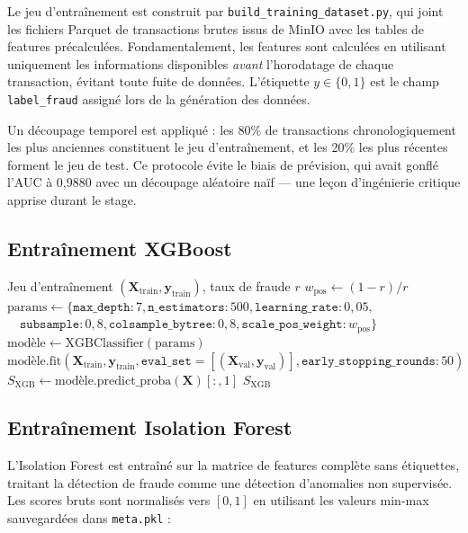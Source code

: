\documentclass[12pt,a4paper,oneside]{book}
\theoremstyle{definition}
\theoremstyle{plain}
\begin{document}
Le jeu d'entraînement est construit par \texttt{build\_training\_dataset.py}, qui joint les fichiers Parquet de transactions brutes issus de MinIO avec les tables de features précalculées. Fondamentalement, les features sont calculées en utilisant uniquement les informations disponibles \textit{avant} l'horodatage de chaque transaction, évitant toute fuite de données. L'étiquette $y \in \{0, 1\}$ est le champ \texttt{label\_fraud} assigné lors de la génération des données.

Un découpage temporel est appliqué : les 80\% de transactions chronologiquement les plus anciennes constituent le jeu d'entraînement, et les 20\% les plus récentes forment le jeu de test. Ce protocole évite le biais de prévision, qui avait gonflé l'AUC à 0,9880 avec un découpage aléatoire naïf — une leçon d'ingénierie critique apprise durant le stage.

\subsection{Entraînement XGBoost}

\begin{algorithm}[H]
\caption{Entraînement XGBoost avec Pondération des Classes}
\label{alg:xgb}
\begin{algorithmic}[1]
\Require Jeu d'entraînement $(\mathbf{X}_\text{train}, \mathbf{y}_\text{train})$, taux de fraude $r$
\State $w_\text{pos} \leftarrow (1 - r) / r$ 
\State $\text{params} \leftarrow \{\texttt{max\_depth}: 7, \texttt{n\_estimators}: 500,
       \texttt{learning\_rate}: 0{,}05,$ \\ $\quad \texttt{subsample}: 0{,}8,
       \texttt{colsample\_bytree}: 0{,}8, \texttt{scale\_pos\_weight}: w_\text{pos}\}$
\State $\text{modèle} \leftarrow \text{XGBClassifier}(\text{params})$
\State $\text{modèle.fit}(\mathbf{X}_\text{train}, \mathbf{y}_\text{train},
       \texttt{eval\_set}=[(\mathbf{X}_\text{val}, \mathbf{y}_\text{val})],
       \texttt{early\_stopping\_rounds}: 50)$
\State $S_\text{XGB} \leftarrow \text{modèle.predict\_proba}(\mathbf{X})[:,1]$
\Return $S_\text{XGB}$
\end{algorithmic}
\end{algorithm}

\subsection{Entraînement Isolation Forest}

L'Isolation Forest est entraîné sur la matrice de features complète sans étiquettes, traitant la détection de fraude comme une détection d'anomalies non supervisée. Les scores bruts sont normalisés vers $[0,1]$ en utilisant les valeurs min-max sauvegardées dans \texttt{meta.pkl} :
\end{document}
